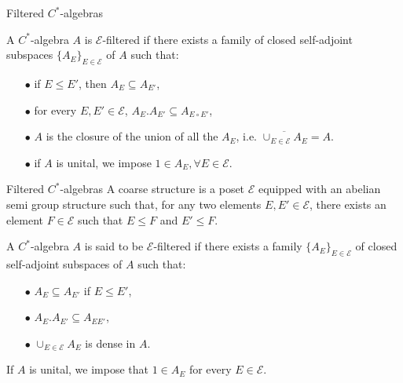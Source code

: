 \begin{frame}{Filtered $C^*$-algebras}
\begin{definitionfr}
A $C^*$-algebra $A$ is $\mathcal E$-filtered if there exists a family of closed self-adjoint subspaces $\{A_E\}_{E\in\mathcal E}$ of $A$ such that:
\begin{itemize}
\item[$\bullet$] if $E\leq E'$, then $A_E\subseteq A_{E'}$,
\item[$\bullet$] for every $E,E'\in\mathcal E$, $A_E.A_{E'}\subseteq A_{E\circ E'}$,
\item[$\bullet$] $A$ is the closure of the union of all the $A_E$, i.e. $\overline{\cup_{E\in\mathcal E}A_E} = A$.
\item[$\bullet$] if $A$ is unital, we impose $1\in A_E,\forall E\in\mathcal E$.
\end{itemize}
\end{definitionfr}
\end{frame}

\begin{frame}{Filtered $C^*$-algebras}	
A coarse structure is a poset $\mathcal E$ equipped with an abelian semi group structure such that, for any two elements $E,E'\in \mathcal E$, there exists an element $F\in \mathcal E$ such that $E\leq F$ and $E'\leq F$. \\

\begin{definition}
A $C^*$-algebra $A$ is said to be $\mathcal E$-filtered if there exists a family $\{A_E \}_{E\in \mathcal E}$ of closed self-adjoint subspaces of $A$ such that:
\begin{itemize}
\item[$\bullet$] $A_E \subseteq A_{E'}$ if $E\leq E'$,
\item[$\bullet$] $A_E . A_{E'} \subseteq A_{EE'}$,
\item[$\bullet$] $\cup_{E\in \mathcal E} A_E$ is dense in $A$.
\end{itemize} 
If $A$ is unital, we impose that $1\in A_E$ for every $E\in \mathcal E$.
\end{definition}
\end{frame}
